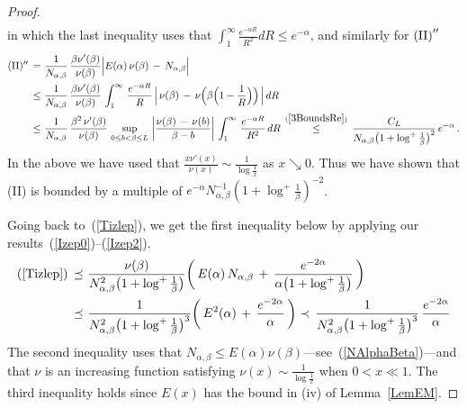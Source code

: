 \documentclass[10pt]{article}
\def\stackrel#1#2{\mathrel{\mathop{#2}\limits^{#1}}}
\numberwithin{equation}{section}
\theoremstyle{definition}
\begin{document}
\begin{proof}
\begin{align}
\end{align}
in which the last inequality uses that $\int_1^{\infty}\frac{ e^{-\alpha R } }{R^2 }dR \leq e^{-\alpha} $, and similarly for  $\textup{(II)}''$ 
\begin{align}\label{Izep2}
(\textup{II})''\,= \,&\, \frac{1}{N_{\alpha,\beta} }\, \frac{ \beta \nu'( \beta)  }{ \nu( \beta)  }  \Big| E(\alpha)\, \nu( \beta)  \,-\,N_{\alpha,\beta} \Big| \nonumber  \\ \,\leq \,&\, \frac{1}{N_{\alpha,\beta} } \, \frac{ \beta \nu'( \beta)  }{ \nu( \beta)  }\,\int_1^{\infty}\,\frac{ e^{-\alpha R  } }{ R }\,\Big|\,\nu( \beta) \,-\, \nu\Big( \beta\Big(1-\frac{1}{R}\Big)  \Big) \, \Big| \, dR
 \nonumber  \\ \,\leq \,&\, \frac{1}{N_{\alpha,\beta} }  \,\frac{ \beta^2\, \nu'( \beta)  }{ \nu( \beta)  } \,\sup_{  0 \leq b < \beta \leq L}\,\bigg| \frac{  \nu(\beta)\,-\,   \nu(b)  }{\beta-b } \bigg|\,\int_1^{\infty}\,\frac{ e^{-\alpha R  } }{ R^2 }\,dR \,\stackrel{ (\ref{3BoundsRe}) }{ \leq} \, \frac{C_L}{N_{\alpha,\beta}\big(1+\log^+ \frac{1}{\beta}\big)^2 }\, e^{-\alpha}\,.
\end{align}
In the above we have used that $ \frac{x \nu'( x)  }{ \nu( x)  } \sim \frac{1}{\log \frac{1}{x} } $ as $x\searrow 0$.  Thus we have shown that (II) is bounded by a multiple of $e^{-\alpha} N_{\alpha,\beta}^{-1} (1+\log^+ \frac{1}{\beta})^{-2}  $.


Going back to~(\ref{Tizlep}), we get the first inequality below by applying our results~(\ref{Izep0})--(\ref{Izep2}).
\begin{align*}
   (\ref{Tizlep})\, \preceq \,&  \,\frac{ \nu(\beta) }{N_{\alpha,\beta}^2 \big(1+\log^+ \frac{1}{\beta}\big)}\bigg( \,E(  \alpha)  \,N_{\alpha,\beta}\,+\,  \frac{e^{-2\alpha}}{\alpha\big(1+\log^+ \frac{1}{\beta}\big)}\,\bigg) \\
 \preceq \,& \,\frac{ 1}{N_{\alpha,\beta}^2 \big(1+\log^+ \frac{1}{\beta}\big)^3}\bigg(\, E^2(  \alpha) \,+\,  \frac{e^{-2\alpha}}{\alpha }\,\bigg)
 \prec  \,\frac{ 1}{N_{\alpha,\beta}^2 \big(1+\log^+\frac{1}{\beta}\big)^3}\,\frac{e^{-2\alpha}}{\alpha }
\end{align*}
The second inequality uses that  $N_{\alpha,\beta}\leq E(\alpha)\nu(\beta)$---see~(\ref{NAlphaBeta})---and that $\nu$ is an increasing function satisfying $\nu(x)\sim\frac{1}{\log\frac{1}{x}}$ when $0 <x\ll 1$.  The third inequality holds since $E(x)$ has the bound in (iv) of Lemma~\ref{LemEM}.
    \end{proof}
\end{document}
